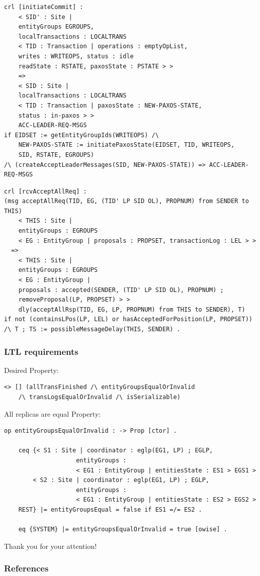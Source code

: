 \documentclass{beamer}
\begin{document}
\begin{frame}[fragile]
    \scriptsize
    \begin{lstlisting}[language=maude]
crl [initiateCommit] :
    < SID' : Site |
    entityGroups EGROUPS,
    localTransactions : LOCALTRANS
    < TID : Transaction | operations : emptyOpList,
    writes : WRITEOPS, status : idle
    readState : RSTATE, paxosState : PSTATE > >
    =>
    < SID : Site |
    localTransactions : LOCALTRANS
    < TID : Transaction | paxosState : NEW-PAXOS-STATE,
    status : in-paxos > >
    ACC-LEADER-REQ-MSGS
if EIDSET := getEntityGroupIds(WRITEOPS) /\
    NEW-PAXOS-STATE := initiatePaxosState(EIDSET, TID, WRITEOPS,
    SID, RSTATE, EGROUPS)
/\ (createAcceptLeaderMessages(SID, NEW-PAXOS-STATE)) => ACC-LEADER-REQ-MSGS
    \end{lstlisting}

\end{frame}
\begin{frame}[fragile]
    \scriptsize 
    \begin{lstlisting}[language=maude]
crl [rcvAcceptAllReq] :
(msg acceptAllReq(TID, EG, (TID' LP SID OL), PROPNUM) from SENDER to THIS)
    < THIS : Site |
    entityGroups : EGROUPS
    < EG : EntityGroup | proposals : PROPSET, transactionLog : LEL > >
  =>
    < THIS : Site |
    entityGroups : EGROUPS
    < EG : EntityGroup |
    proposals : accepted(SENDER, (TID' LP SID OL), PROPNUM) ;
    removeProposal(LP, PROPSET) > >
    dly(acceptAllRsp(TID, EG, LP, PROPNUM) from THIS to SENDER), T)
if not (containsLPos(LP, LEL) or hasAcceptedForPosition(LP, PROPSET))
/\ T ; TS := possibleMessageDelay(THIS, SENDER) .       
    \end{lstlisting}
\end{frame}
\begin{frame}[fragile]
    \frametitle{LTL requirements}
    Desired Property: 
    \begin{lstlisting}[language=maude, basicstyle=\scriptsize]
    <> [] (allTransFinished /\ entityGroupsEqualOrInvalid
    /\ transLogsEqualOrInvalid /\ isSerializable)
    \end{lstlisting}

    \pause
    All replicas are equal Property:
    \begin{lstlisting}[language=maude, basicstyle=\scriptsize]
    op entityGroupsEqualOrInvalid : -> Prop [ctor] .
    
    ceq {< S1 : Site | coordinator : eglp(EG1, LP) ; EGLP,
                    entityGroups :
                    < EG1 : EntityGroup | entitiesState : ES1 > EGS1 >
        < S2 : Site | coordinator : eglp(EG1, LP) ; EGLP,
                    entityGroups :
                    < EG1 : EntityGroup | entitiesState : ES2 > EGS2 >
    REST} |= entityGroupsEqual = false if ES1 =/= ES2 .
    
    eq {SYSTEM} |= entityGroupsEqualOrInvalid = true [owise] .
    \end{lstlisting}
\end{frame}

\begin{frame}
    \huge
    Thank you for your attention!
\end{frame}
\begin{frame}[allowframebreaks]
      \nocite{*}
        \frametitle{References}
        
        
\end{frame}
\end{document}
